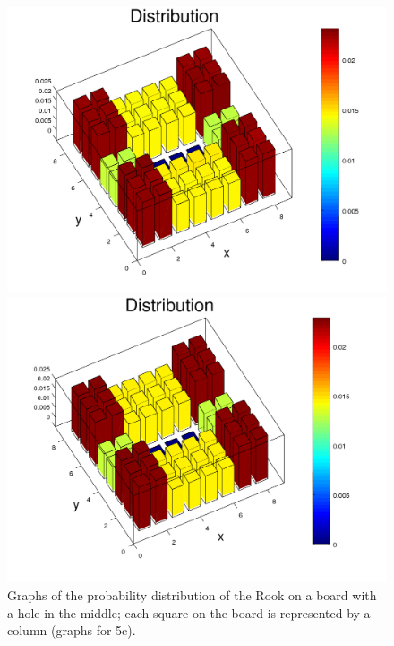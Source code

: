 \documentclass{amsart}
\numberwithin{equation}{section}
\begin{document}
\begin{figure}[!h]
\begin{minipage}{0.50\textwidth}
     \includegraphics[width=1.0\linewidth]{figures/withHole/figure_Rook_path_n1000000.png}
     \captionsetup{labelformat=empty}
     \caption*{$n=1,000,000$}
   \end{minipage}\hfil
   \begin{minipage}{0.50\textwidth}
     \centering
     \includegraphics[width=1.0\linewidth]{figures/withHole/figure_Rook_path_n10000000.png}
     \captionsetup{labelformat=empty}
     \caption*{$n=10,000,000$}
    \end{minipage}\hfil
    \caption{Graphs of the probability distribution of the Rook on a board with a hole in the middle; each square on the board is represented by a column (graphs for 5c).}
    \label{plots:graphs_5c1}
\end{figure}
\end{document}
